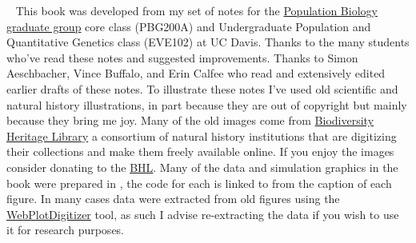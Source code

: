 \documentclass{tufte-book}
\begin{document}
\begin{fullwidth}
~\vfill
\thispagestyle{empty}
\setlength{\parindent}{0pt}
\setlength{\parskip}{\baselineskip}
  \small This book was developed from my set of notes for the \href{http://www-eve.ucdavis.edu/eve/pbg/}{Population
  Biology graduate group} core class (PBG200A) and Undergraduate Population and
  Quantitative Genetics class (EVE102) at UC Davis. Thanks to the many
  students who've read these notes and suggested improvements. Thanks
 to Simon Aeschbacher, Vince Buffalo, and Erin Calfee who read
 and extensively edited earlier drafts of these notes. To illustrate these notes I've used old scientific and natural history illustrations, in part
 because they are out of copyright but mainly because they bring me
 joy. Many of the old images come from
 \href{https://www.biodiversitylibrary.org/}{Biodiversity Heritage
   Library} a consortium of natural history institutions that are
 digitizing their collections and make them freely available
 online. If you enjoy the images consider donating to the
 \href{http://library.si.edu/donate-bhl}{BHL}. Many of the data and
 simulation graphics in the book were prepared in \citet{Rstats},
 the code for each is linked to from the caption of each figure. In many cases
 data were extracted from old figures using the
 \href{https://automeris.io/WebPlotDigitizer/}{WebPlotDigitizer}
 tool, as such I advise re-extracting the data if you wish to use it
 for research purposes.
\end{fullwidth}

\tableofcontents













%




\end{document}
